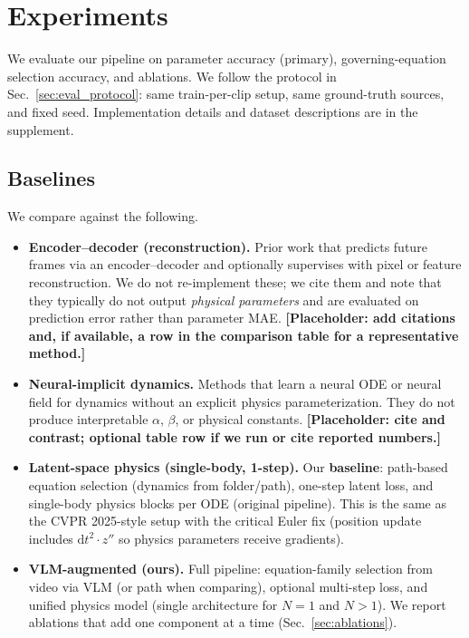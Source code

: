 
\section{Experiments}
\label{sec:experiments}

We evaluate our pipeline on parameter accuracy (primary), governing-equation selection accuracy, and ablations. We follow the protocol in Sec.~\ref{sec:eval_protocol}: same train-per-clip setup, same ground-truth sources, and fixed seed. Implementation details and dataset descriptions are in the supplement.

\subsection{Baselines}
\label{sec:baselines}

We compare against the following.

\begin{itemize}[noitemsep]
  \item \textbf{Encoder--decoder (reconstruction).} Prior work that predicts future frames via an encoder--decoder and optionally supervises with pixel or feature reconstruction. We do not re-implement these; we cite them and note that they typically do not output \emph{physical parameters} and are evaluated on prediction error rather than parameter MAE. \textbf{[Placeholder: add citations and, if available, a row in the comparison table for a representative method.]}
  \item \textbf{Neural-implicit dynamics.} Methods that learn a neural ODE or neural field for dynamics without an explicit physics parameterization. They do not produce interpretable $\alpha$, $\beta$, or physical constants. \textbf{[Placeholder: cite and contrast; optional table row if we run or cite reported numbers.]}
  \item \textbf{Latent-space physics (single-body, 1-step).} Our \textbf{baseline}: path-based equation selection (dynamics from folder/path), one-step latent loss, and single-body physics blocks per ODE (original pipeline). This is the same as the CVPR 2025-style setup with the critical Euler fix (position update includes $\mathrm{d}t^2 \cdot z''$ so physics parameters receive gradients).
  \item \textbf{VLM-augmented (ours).} Full pipeline: equation-family selection from video via VLM (or path when comparing), optional multi-step loss, and unified physics model (single architecture for $N=1$ and $N>1$). We report ablations that add one component at a time (Sec.~\ref{sec:ablations}).
\end{itemize}

